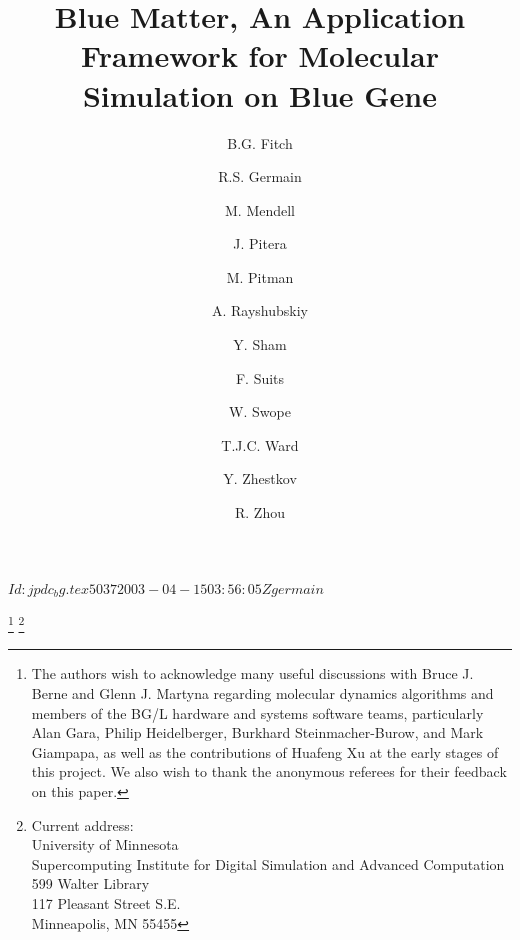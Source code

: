 \documentclass[doublespacing]{elsart}
\begin{document}
\rcsInfo $Id: jpdc_bg.tex 5037 2003-04-15 03:56:05Z germain $


\begin{frontmatter}


\title{Blue Matter, An Application Framework for Molecular Simulation on Blue Gene}
\thanks[acks]{The authors wish to acknowledge many useful discussions
with Bruce J. Berne and Glenn J. Martyna regarding molecular dynamics
algorithms and members of the BG/L hardware and systems software
teams, particularly Alan Gara, Philip Heidelberger, Burkhard
Steinmacher-Burow, and Mark Giampapa, as well as the contributions of
Huafeng Xu at the early stages of this project. We also wish to thank
the anonymous referees for their feedback on this paper.}
\thanks[yuk_in_mn]{Current address:\\ University of Minnesota\\
Supercomputing Institute for Digital Simulation and Advanced
Computation\\ 599 Walter Library\\ 117 Pleasant Street S.E.\\
Minneapolis, MN 55455}

\author[ykt]{B.G. Fitch}
\author[ykt]{R.S. Germain}
\author[toronto]{M. Mendell}
\author[arc]{J. Pitera}
\author[ykt]{M. Pitman}
\author[ykt]{A. Rayshubskiy}
\author[ykt]{Y. Sham}
\author[ykt]{F. Suits}
\author[arc]{W. Swope}
\author[ykt]{T.J.C. Ward}
\author[ykt]{Y. Zhestkov}
\author[ykt]{R. Zhou}
\address[ykt]{IBM Thomas J. Watson Research Center\\
P.O. Box 218\\
Yorktown Heights, NY 10598}




\end{frontmatter}
\end{document}
